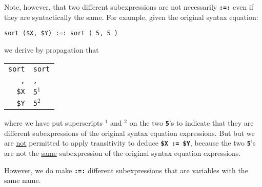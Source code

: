 \documentclass[12pt]{article}
\newcommand{\TT}[1]{{\tt \bfseries #1}}
\begin{document}
Note, however, that two different subexpressions
are not necessarily \TT{:=:} even if they are syntactically the same.
For example, given the original syntax equation:

\begin{center}
\verb/sort ($X, $Y) :=: sort ( 5, 5 )/
\end{center}

we derive by propagation that

\begin{center}
\begin{tabular}{r@\TT{~:=:~}l}
\verb/sort/ & \verb/sort/ \\
\verb/,/ & \verb/,/ \\
\verb/$X/ & \verb/5/$^1$ \\
\verb/$Y/ & \verb/5/$^2$ \\
\end{tabular}
\end{center}

where we have put superscripts $^1$ and $^2$ on the two \TT{5}'s to
indicate that they are different subexpressions of the original
syntax equation expressions.  But
but we are \underline{not} permitted to apply transitivity
to deduce \TT{\$X := \$Y},
because the two \TT{5}'s are not the \underline{same} subexpression of
the original syntax equation expressions.

However, we do make \TT{:=:} different subexpressions
that are variables with the same name.
\end{document}

